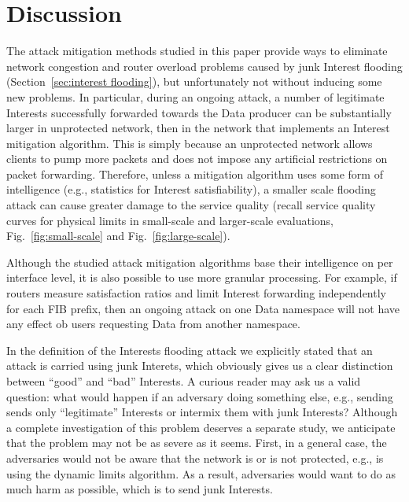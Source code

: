 \section{Discussion}
\label{sec:discussion}


The attack mitigation methods studied in this paper provide ways to eliminate network congestion and router overload problems caused by junk Interest flooding (Section~\ref{sec:interest flooding}), but unfortunately not without inducing some new problems.
In particular, during an ongoing attack, a number of legitimate Interests successfully forwarded towards the Data producer can be substantially larger in unprotected network, then in the network that implements an Interest mitigation algorithm.  
This is simply because an unprotected network allows clients to pump more packets and does not impose any artificial restrictions on packet forwarding.
Therefore, unless a mitigation algorithm uses some form of intelligence (e.g., statistics for Interest satisfiability), a smaller scale flooding attack can cause greater damage to the service quality (recall service quality curves for physical limits in small-scale and larger-scale evaluations, Fig.~\ref{fig:small-scale} and Fig.~\ref{fig:large-scale}).

Although the studied attack mitigation algorithms base their intelligence on per interface level, it is also possible to use more granular processing.
For example, if routers measure satisfaction ratios and limit Interest forwarding independently for each FIB prefix, then an ongoing attack on one Data namespace will not have any effect ob users requesting Data from another namespace.


In the definition of the Interests flooding attack we explicitly stated that an attack is carried using junk Interets, which obviously gives us a clear distinction between ``good'' and ``bad'' Interests.
A curious reader may ask us a valid question: what would happen if an adversary doing something else, e.g., sending sends only ``legitimate'' Interests or intermix them with junk Interests?
Although a complete investigation of this problem deserves a separate study, we anticipate that the problem may not be as severe as it seems.
First, in a general case, the adversaries would not be aware that the network is or is not protected, e.g., is using the dynamic limits algorithm.
As a result, adversaries would want to do as much harm as possible, which is to send junk Interests.

